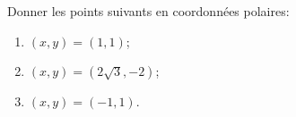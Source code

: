 
\begin{exercice}\label{exoOutilsMath-0023}

	Donner les points suivants en coordonnées polaires:
	\begin{enumerate}
		\item
			$(x,y)=(1,1)$;
		\item
			$(x,y)=(2\sqrt{3},-2)$;
		\item
			$(x,y)=(-1,1)$.
	\end{enumerate}

\end{exercice}

